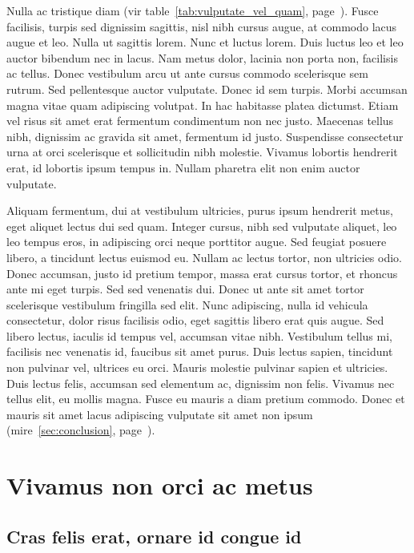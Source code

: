 \documentclass{EPUProjetDi}
\begin{document}
Nulla ac tristique diam (vir table~\ref{tab:vulputate_vel_quam}, page~\pageref{tab:vulputate_vel_quam}). Fusce facilisis, turpis sed dignissim sagittis, nisl nibh cursus augue, at commodo lacus augue et leo. Nulla ut sagittis lorem. Nunc et luctus lorem. Duis luctus leo et leo auctor bibendum nec in lacus. Nam metus dolor, lacinia non porta non, facilisis ac tellus. Donec vestibulum arcu ut ante cursus commodo scelerisque sem rutrum. Sed pellentesque auctor vulputate. Donec id sem turpis. Morbi accumsan magna vitae quam adipiscing volutpat. In hac habitasse platea dictumst. Etiam vel risus sit amet erat fermentum condimentum non nec justo. Maecenas tellus nibh, dignissim ac gravida sit amet, fermentum id justo. Suspendisse consectetur urna at orci scelerisque et sollicitudin nibh molestie. Vivamus lobortis hendrerit erat, id lobortis ipsum tempus in. Nullam pharetra elit non enim auctor vulputate.

Aliquam fermentum, dui at vestibulum ultricies, purus ipsum hendrerit metus, eget aliquet lectus dui sed quam. Integer cursus, nibh sed vulputate aliquet, leo leo tempus eros, in adipiscing orci neque porttitor augue. Sed feugiat posuere libero, a tincidunt lectus euismod eu. Nullam ac lectus tortor, non ultricies odio. Donec accumsan, justo id pretium tempor, massa erat cursus tortor, et rhoncus ante mi eget turpis. Sed sed venenatis dui. Donec ut ante sit amet tortor scelerisque vestibulum fringilla sed elit. Nunc adipiscing, nulla id vehicula consectetur, dolor risus facilisis odio, eget sagittis libero erat quis augue. Sed libero lectus, iaculis id tempus vel, accumsan vitae nibh. Vestibulum tellus mi, facilisis nec venenatis id, faucibus sit amet purus. Duis lectus sapien, tincidunt non pulvinar vel, ultrices eu orci. Mauris molestie pulvinar sapien et ultricies. Duis lectus felis, accumsan sed elementum ac, dignissim non felis. Vivamus nec tellus elit, eu mollis magna. Fusce eu mauris a diam pretium commodo. Donec et mauris sit amet lacus adipiscing vulputate sit amet non ipsum (mire~\ref{sec:conclusion}, page~\pageref{sec:conclusion}).

\chapter{Vivamus non orci ac metus}

\section{Cras felis erat, ornare id congue id}
\end{document}
